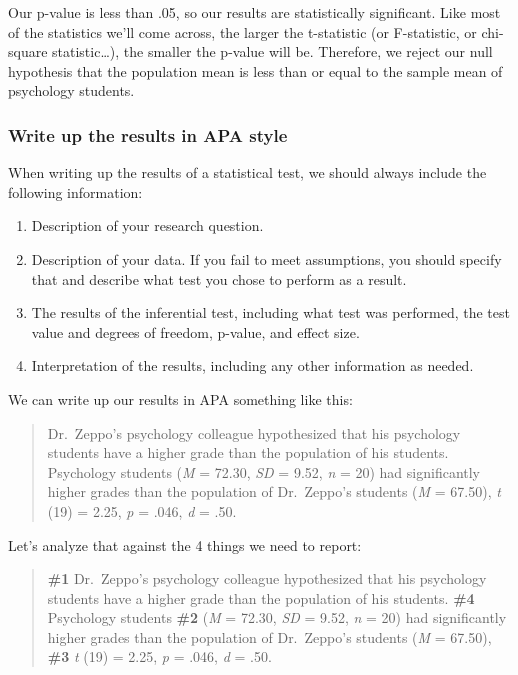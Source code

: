\documentclass[
]{book}
\providecommand{\tightlist}{%
  \setlength{\itemsep}{0pt}\setlength{\parskip}{0pt}}
\begin{document}
Our p-value is less than .05, so our results are statistically significant. Like most of the statistics we'll come across, the larger the t-statistic (or F-statistic, or chi-square statistic\ldots), the smaller the p-value will be. Therefore, we reject our null hypothesis that the population mean is less than or equal to the sample mean of psychology students.

\hypertarget{write-up-the-results-in-apa-style}{%
\subsubsection{Write up the results in APA style}\label{write-up-the-results-in-apa-style}}

When writing up the results of a statistical test, we should always include the following information:

\begin{enumerate}
\def\labelenumi{\arabic{enumi}.}
\tightlist
\item
  Description of your research question.
\item
  Description of your data. If you fail to meet assumptions, you should specify that and describe what test you chose to perform as a result.
\item
  The results of the inferential test, including what test was performed, the test value and degrees of freedom, p-value, and effect size.
\item
  Interpretation of the results, including any other information as needed.
\end{enumerate}

We can write up our results in APA something like this:

\begin{quote}
Dr.~Zeppo's psychology colleague hypothesized that his psychology students have a higher grade than the population of his students. Psychology students (\emph{M} = 72.30, \emph{SD} = 9.52, \emph{n} = 20) had significantly higher grades than the population of Dr.~Zeppo's students (\emph{M} = 67.50), \emph{t} (19) = 2.25, \emph{p} = .046, \emph{d} = .50.
\end{quote}

Let's analyze that against the 4 things we need to report:

\begin{quote}
\textbf{\#1} Dr.~Zeppo's psychology colleague hypothesized that his psychology students have a higher grade than the population of his students. \textbf{\#4} Psychology students \textbf{\#2} (\emph{M} = 72.30, \emph{SD} = 9.52, \emph{n} = 20) had significantly higher grades than the population of Dr.~Zeppo's students (\emph{M} = 67.50), \textbf{\#3} \emph{t} (19) = 2.25, \emph{p} = .046, \emph{d} = .50.
\end{quote}
\end{document}
